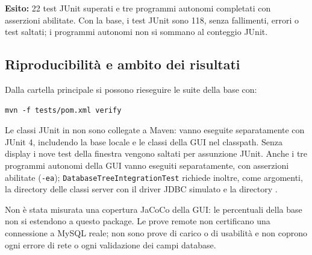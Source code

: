 \textbf{Esito:} 22 test JUnit superati e tre programmi autonomi completati
con asserzioni abilitate. Con la base, i test JUnit sono 118, senza fallimenti,
errori o test saltati; i programmi autonomi non si sommano al conteggio JUnit.

\subsection*{Riproducibilità e ambito dei risultati}

Dalla cartella principale si possono rieseguire le suite della base con:

\begin{lstlisting}
mvn -f tests/pom.xml verify
\end{lstlisting}

Le classi JUnit in  non sono collegate a Maven:
vanno eseguite separatamente con JUnit 4, includendo la base locale e le classi
della GUI nel classpath. Senza display i nove test della finestra vengono
saltati per assunzione JUnit. Anche i tre programmi autonomi della GUI vanno
eseguiti separatamente, con asserzioni abilitate (\texttt{-ea});
\texttt{DatabaseTreeIntegrationTest} richiede inoltre, come argomenti,
la directory delle classi server con il driver JDBC simulato e la directory
.

Non è stata misurata una copertura JaCoCo della GUI: le percentuali della
base non si estendono a questo package. Le prove remote non certificano una
connessione a MySQL reale; non sono prove di carico o di usabilità e non
coprono ogni errore di rete o ogni validazione dei campi database.
